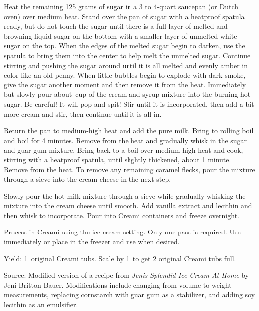 \documentclass[letterpaper]{recipePMG}
\newcommand{\quarter}{\nicefrac{1}{4} \,}
\newcommand{\third}{\nicefrac{1}{3} \,}
\newcommand{\half}{\nicefrac{1}{2} \,}
\begin{document}
Heat the remaining 125 grams of sugar in a 3 to 4-quart saucepan (or Dutch oven) over medium heat. Stand over the pan of sugar with a heatproof spatula ready, but do not touch the sugar until there is a full layer of melted and browning liquid sugar on the bottom with a smaller layer of unmelted white sugar on the top. When the edges of the melted sugar begin to darken, use the spatula to bring them into the center to help melt the unmelted sugar. Continue stirring and pushing the sugar around until it is all melted and evenly amber in color like an old penny. When little bubbles begin to explode with dark smoke, give the sugar another moment and then remove it from the heat. Immediately but slowly pour about \quarter cup of the cream and syrup mixture into the burning-hot sugar. Be careful! It will pop and spit! Stir until it is incorporated, then add a bit more cream and stir, then continue until it is all in. 

Return the pan to medium-high heat and add the pure milk. Bring to rolling boil and boil for 4 minutes. Remove from the heat and gradually whisk in the sugar and guar gum mixture. Bring back to a boil over medium-high heat and cook, stirring with a heatproof spatula, until slightly thickened, about 1 minute. Remove from the heat. To remove any remaining caramel flecks, pour the mixture through a sieve into the cream cheese in the next step.

Slowly pour the hot milk mixture through a sieve while gradually whisking the mixture into the cream cheese until smooth. Add vanilla extract and lecithin and then whisk to incorporate. Pour into Creami containers and freeze overnight.  

Process in Creami using the ice cream setting.  Only one pass is required.  Use immediately or place in the freezer and use when desired.

Yield: 1\half original Creami tubs. Scale by 1\third to get 2 original Creami tubs full.

Source: Modified version of a recipe from \textit{Jenis Splendid Ice Cream At Home} by Jeni Britton Bauer. Modifications include changing from volume to weight measurements, replacing cornstarch with guar gum as a stabilizer, and adding soy lecithin as an emulsifier.

\newpage
{}

\end{document}
